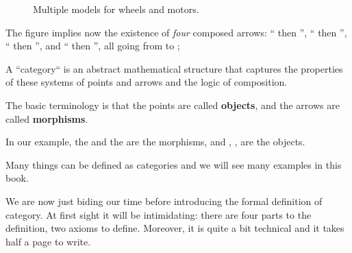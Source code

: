 \begin{figure}[h!]
  \centering
  \caption{Multiple models for wheels and motors.}
   \label{fig:e4bis}
\end{figure}

The figure implies now the existence of \emph{four} composed
arrows: `` then '',
`` then '',
`` then '', and
`` then '', all going from \translationalmotion to \electricpower;


A ``category`` is an abstract mathematical structure that captures the properties
of these systems of points and arrows and the logic of composition.

The basic terminology is that the points are called \textbf{objects},
and the arrows are called \textbf{morphisms}.

In our example, the \motor and the \wheels are the morphisms, and \electricpower, \rotationalmotion,
\translationalmotion are the objects.

Many things can be defined as categories and we will see many examples in this book.

We are now just biding our time before introducing the formal definition of category.
At first sight it will be intimidating: there are four parts to the definition, two axioms to define.
Moreover, it is quite a bit technical and it takes half a page to write.

